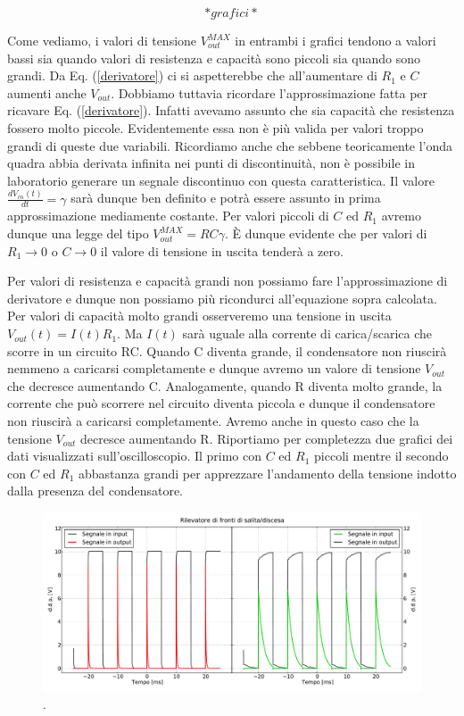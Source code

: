 $$*grafici*$$


Come vediamo, i valori di tensione $V_{out}^{MAX}$ in entrambi i grafici tendono a valori bassi sia quando valori di resistenza e capacità sono piccoli sia quando sono grandi. Da Eq. (\ref{derivatore}) ci si aspetterebbe che all'aumentare di $R_1$ e $C$ aumenti anche $V_{out}$. Dobbiamo tuttavia ricordare l'approssimazione fatta per ricavare Eq. (\ref{derivatore}). Infatti avevamo assunto che sia capacità che resistenza fossero molto piccole. Evidentemente essa non è più valida per valori troppo grandi di queste due variabili. Ricordiamo anche che sebbene teoricamente l'onda quadra abbia derivata infinita nei punti di discontinuità, non è possibile in laboratorio generare un segnale discontinuo con questa caratteristica. Il valore $\frac{dV_{in}(t)}{dt}=\gamma$  sarà dunque ben definito e potrà essere assunto in prima approssimazione mediamente costante. Per valori piccoli di $C$ ed $R_1$ avremo dunque una legge del tipo $V_{out}^{MAX}= RC \gamma$. \`E dunque evidente che per valori di $R_1\rightarrow 0$ o $C\rightarrow 0$ il valore di tensione in uscita tenderà a zero.

Per valori di resistenza e capacità grandi non possiamo fare l'approssimazione di derivatore e dunque non possiamo più ricondurci all'equazione sopra calcolata. Per valori di capacità molto grandi osserveremo una tensione in uscita $V_{out}(t)=I(t) R_1$. Ma $I(t)$ sarà uguale alla corrente di carica/scarica che scorre in un circuito RC. Quando C diventa grande, il condensatore non riuscirà nemmeno a caricarsi completamente e dunque avremo un valore di tensione $V_{out}$ che decresce aumentando C. Analogamente, quando R diventa molto grande, la corrente che può scorrere nel circuito diventa piccola e dunque il condensatore non riuscirà a caricarsi completamente. Avremo anche in questo caso che la tensione $V_{out}$ decresce aumentando R. Riportiamo per completezza due grafici dei dati visualizzati sull'oscilloscopio. Il primo con $C$ ed $R_1$ piccoli mentre il secondo con $C$ ed $R_1$ abbastanza grandi per apprezzare l'andamento della tensione indotto dalla presenza del condensatore. 


\begin{figure}[h]
\center
	\includegraphics[width=\textwidth]{peaks(2).pdf}
	\caption{.}
	\label{fig:peaks}
\end{figure}

